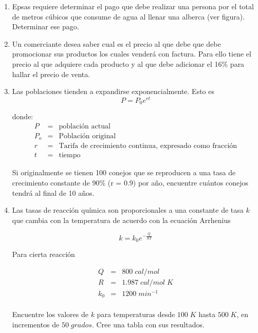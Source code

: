 \documentclass{scrartcl}
\begin{document}
\begin{enumerate}
		\item Epsas requiere determinar el pago que debe realizar una persona por el total de metros cúbicos que consume de agua al llenar una alberca (ver figura). Determinar ese pago.
	
		\item Un comerciante desea saber cual es el precio al que debe que debe promocionar sus productos los cuales venderá con factura. Para ello tiene el precio al que adquiere cada producto y al que debe adicionar el 16\% para hallar el precio de venta.
		
		\item Las poblaciones tienden a expandirse exponencialmente. Esto es 
		\begin{equation*}
			P = P_{0}e^{rt}
		\end{equation*}
		
		donde:
		\begin{eqnarray*}
			P		   &=&	\mbox{población actual} \\
			P_{o}  &=& \mbox{Población original} \\
			r 			& = & \mbox{Tarifa de crecimiento continua, expresado como fracción}\\
			t 			& = & \mbox{tiempo}
		\end{eqnarray*}
		
		Si originalmente se tienen 100 conejos que se reproducen a una tasa de crecimiento constante de 90\% (r = 0.9) por año, encuentre cuántos conejos tendrá al final de 10 años.
		
		\item Las tasas de reacción química son proporcionales a una constante de tasa $k$ que cambia con la temperatura de acuerdo con la ecuación Arrhenius
		
		\begin{equation*}
			k = k_{0} e^{-\frac{Q}{RT}}
		\end{equation*}
		
		Para cierta reacción
		
		\begin{eqnarray*}
			Q  &=&	800\;cal/mol \\
			R  &=&  1.987\;cal/mol\;K \\
			k_{0} &=& 1200\;min^{-1} \\
		\end{eqnarray*}
		
		Encuentre los valores de $k$ para temperaturas desde $100\;K$ hasta $500\;K$, en incrementos de $50\;grados$. Cree una tabla con sus resultados.
	\end{enumerate}
\end{document}
